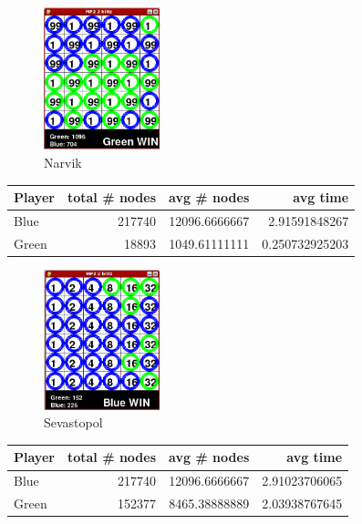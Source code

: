 \begin{multicols*}{2}
\begin{figure}[H]
\centering
\includegraphics[width=0.3\textwidth]{graphics/ma_narvik.png}
\caption{Narvik}
\end{figure}
\begin{tabular}{l|r|r|r}
  Player & total \# nodes & avg \# nodes & avg time \\
  \hline
  Blue & 217740 & 12096.6666667 & 2.91591848267 \\
  Green & 18893 & 1049.61111111 & 0.250732925203 \\
\end{tabular}

\begin{figure}[H]
\centering
\includegraphics[width=0.3\textwidth]{graphics/ma_sevastopol.png}
\caption{Sevastopol}
\end{figure}
\begin{tabular}{l|r|r|r}
  Player & total \# nodes & avg \# nodes & avg time \\
  \hline
  Blue & 217740 & 12096.6666667 & 2.91023706065 \\
  Green & 152377 & 8465.38888889 & 2.03938767645 \\
\end{tabular}


\end{multicols*}

